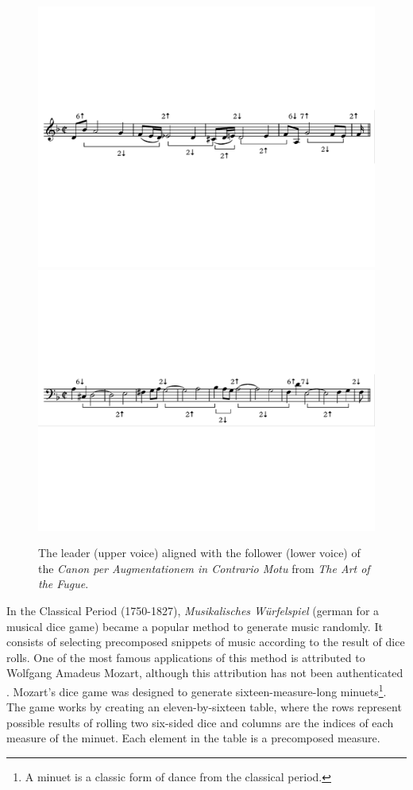 \begin{figure}[!h]
 \centering
 \includegraphics[width=\columnwidth]{imgs/background/canon_b.pdf}
 \includegraphics[width=\columnwidth]{imgs/background/canon_c.pdf}
 \caption{The leader (upper voice) aligned with the follower (lower voice) of the \textit{Canon per Augmentationem in Contrario Motu} from \textit{The Art of the Fugue}. }
 \label{fig:canon_subject}
\end{figure}

In the Classical Period (1750-1827), \textit{Musikalisches W{\"u}rfelspiel} (german for a musical dice game) became a popular method to generate music randomly. It consists of selecting precomposed snippets of music according to the result of dice rolls. One of the most famous applications of this method is attributed to Wolfgang Amadeus Mozart, although this attribution has not been authenticated \cite{cope1989experiments}. Mozart's dice game was designed to generate sixteen-measure-long minuets\footnote{A minuet is a classic form of dance from the classical period.}. The game works by creating an eleven-by-sixteen table, where the rows represent possible results of rolling two six-sided dice and columns are the indices of each measure of the minuet. Each element in the table is a precomposed measure.

